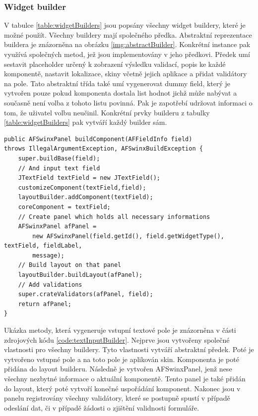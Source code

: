 \subsubsection{Widget builder}
V tabulce \ref{table:widgetBuilders} jsou popsány všechny widget buildery, které je možné použít. Všechny buildery mají společného předka. Abstraktní reprezentace buildera je znázorněna na obrázku \ref{img:abstractBuilder}. Konkrétní instance pak využívá společných metod, jež jsou implementovány v jeho předkovi. Předek umí sestavit placeholder určený k zobrazení výsledku validací, popis ke každé komponentě, nastavit lokalizace, skiny včetně jejich aplikace a přidat validátory na pole. Tato abstraktní třída také umí vygenerovat dummy field, který je vytvořen pouze pokud komponenta dostala list hodnot jichž může nabývat a současně není volba z tohoto listu povinná. Pak je zapotřebí udržovat informaci o tom, že uživatel volbu neučinil. Konkrétní prvky builderu z tabulky \ref{table:widgetBuilders} pak vytváří každý builder sám. 

\begin{lstlisting}[caption={Vytváření vstupního pole builderem.},
label={code:textInputBuilder}, basicstyle=\footnotesize]
public AFSwinxPanel buildComponent(AFFieldInfo field) 
throws IllegalArgumentException, AFSwinxBuildException {
	super.buildBase(field);
	// And input text field
	JTextField textField = new JTextField();
	customizeComponent(textField,field);
	layoutBuilder.addComponent(textField);
	coreComponent = textField;
	// Create panel which holds all necessary informations
	AFSwinxPanel afPanel =
		new AFSwinxPanel(field.getId(), field.getWidgetType(), textField, fieldLabel,
		message);
	// Build layout on that panel
	layoutBuilder.buildLayout(afPanel);
	// Add validations
	super.crateValidators(afPanel, field);
	return afPanel;
}
\end{lstlisting}

Ukázka metody, která vygeneruje vstupní textové pole je znázorněna v části zdrojových kódu \ref{code:textInputBuilder}. Nejprve jsou vytvořeny společné vlastnosti pro všechny buildery. Tyto vlastnosti vytváří abstraktní předek. Poté je vytvořeno vstupné pole a na toto pole je aplikován skin. Komponenta je poté přidána do layout builderu. Následně je vytvořen AFSwinxPanel, jenž nese všechny nezbytné informace o aktuální komponentě. Tento panel je také přidán do layout, který poté vytvoří konečné uspořádání komponent. Nakonec jsou v panelu registrovány všechny validátory, které se postupně spustí v případě odeslání dat, či v případě žádosti o zjištění validnosti formuláře.

